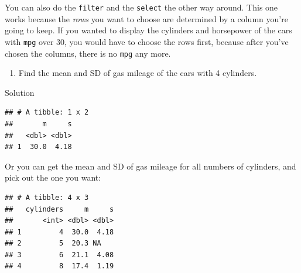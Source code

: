 \documentclass[]{tufte-book}
\newenvironment{Shaded}{}{}
\newcommand{\DataTypeTok}[1]{\textcolor[rgb]{0.56,0.13,0.00}{#1}}
\newcommand{\DecValTok}[1]{\textcolor[rgb]{0.25,0.63,0.44}{#1}}
\newcommand{\KeywordTok}[1]{\textcolor[rgb]{0.00,0.44,0.13}{\textbf{#1}}}
\newcommand{\NormalTok}[1]{#1}
\newcommand{\OperatorTok}[1]{\textcolor[rgb]{0.40,0.40,0.40}{#1}}
\newcommand{\StringTok}[1]{\textcolor[rgb]{0.25,0.44,0.63}{#1}}
\providecommand{\tightlist}{%
  \setlength{\itemsep}{0pt}\setlength{\parskip}{0pt}}
\theoremstyle{definition}
\theoremstyle{definition}
\theoremstyle{definition}
\theoremstyle{remark}
\begin{document}
You can also do the \texttt{filter} and the \texttt{select} the other
way around. This one works because the \emph{rows} you want to choose
are determined by a column you're going to keep. If you wanted to
display the cylinders and horsepower of the cars with \texttt{mpg} over
30, you would have to choose the rows first, because after you've chosen
the columns, there is no \texttt{mpg} any more.

\begin{enumerate}
\def\labelenumi{(\alph{enumi})}
\setcounter{enumi}{5}
\tightlist
\item
  Find the mean and SD of gas mileage of the cars with 4 cylinders.
\end{enumerate}

Solution

\begin{Shaded}
\end{Shaded}

\begin{verbatim}
## # A tibble: 1 x 2
##       m     s
##   <dbl> <dbl>
## 1  30.0  4.18
\end{verbatim}

Or you can get the mean and SD of gas mileage for all numbers of
cylinders, and pick out the one you want:

\begin{Shaded}
\end{Shaded}

\begin{verbatim}
## # A tibble: 4 x 3
##   cylinders     m     s
##       <int> <dbl> <dbl>
## 1         4  30.0  4.18
## 2         5  20.3 NA   
## 3         6  21.1  4.08
## 4         8  17.4  1.19
\end{verbatim}
\end{document}
